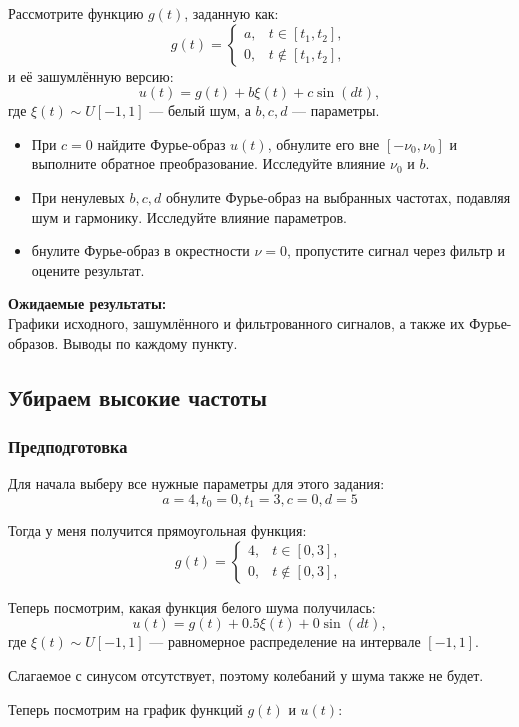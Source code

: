 \documentclass[a4paper,12pt]{article}
\begin{document}
Рассмотрите функцию \( g(t) \), заданную как:
\[
g(t) = 
\begin{cases} 
a, & t \in [t_1, t_2], \\
0, & t \notin [t_1, t_2],
\end{cases}
\]
и её зашумлённую версию:
\[
u(t) = g(t) + b\xi(t) + c \sin(dt),
\]
где \(\xi(t) \sim U[-1, 1]\) — белый шум, а \( b, c, d \) — параметры.

\begin{itemize}
\item При \( c = 0 \) найдите Фурье-образ \( u(t) \), обнулите его вне \([- \nu_0, \nu_0]\) и выполните обратное преобразование. Исследуйте влияние \( \nu_0 \) и \( b \).

\item При ненулевых \( b, c, d \) обнулите Фурье-образ на выбранных частотах, подавляя шум и гармонику. Исследуйте влияние параметров.

\item бнулите Фурье-образ в окрестности \( \nu = 0 \), пропустите сигнал через фильтр и оцените результат.
\end{itemize}
\textbf{Ожидаемые результаты:} \\
Графики исходного, зашумлённого и фильтрованного сигналов, а также их Фурье-образов. Выводы по каждому пункту.

\subsection{Убираем высокие частоты}
\subsubsection{Предподготовка}
Для начала выберу все нужные параметры для этого задания:
\[
a = 4, t_0 = 0, t_1 = 3, c = 0, d = 5
\]

Тогда у меня получится прямоугольная функция:\[
g(t) = 
\begin{cases} 
4, & t \in [0, 3], \\
0, & t \notin [0, 3],
\end{cases}
\]

Теперь посмотрим, какая функция белого шума получилась:
\[
u(t) = g(t) + 0.5\xi(t) + 0\sin(dt),
\]
где \(\xi(t) \sim U[-1, 1]\) — равномерное распределение на интервале \([-1, 1]\).

Слагаемое с синусом отсутствует, поэтому колебаний у шума также не будет. 

Теперь посмотрим на график функций \(g(t)\) и \(u(t)\):
\end{document}
